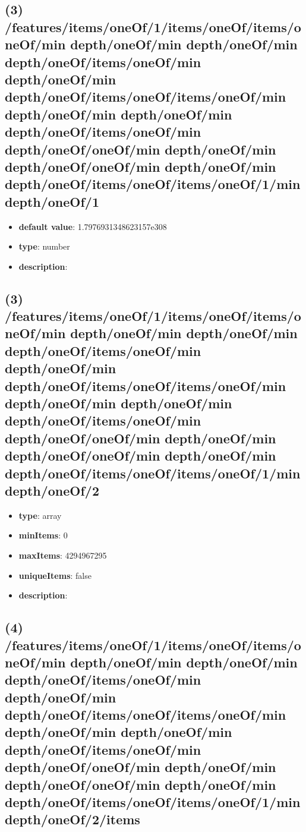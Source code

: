 \subsection{(3) /features/items/oneOf/1/items/oneOf/items/oneOf/min depth/oneOf/min depth/oneOf/min depth/oneOf/items/oneOf/min depth/oneOf/min depth/oneOf/items/oneOf/items/oneOf/min depth/oneOf/min depth/oneOf/min depth/oneOf/items/oneOf/min depth/oneOf/oneOf/min depth/oneOf/min depth/oneOf/oneOf/min depth/oneOf/min depth/oneOf/items/oneOf/items/oneOf/1/min depth/oneOf/1}
\begin{itemize}[leftmargin=3em]\item {\bf default value}: 1.7976931348623157e308
\item {\bf type}: number
\item {\bf description}: 
\end{itemize}\subsection{(3) /features/items/oneOf/1/items/oneOf/items/oneOf/min depth/oneOf/min depth/oneOf/min depth/oneOf/items/oneOf/min depth/oneOf/min depth/oneOf/items/oneOf/items/oneOf/min depth/oneOf/min depth/oneOf/min depth/oneOf/items/oneOf/min depth/oneOf/oneOf/min depth/oneOf/min depth/oneOf/oneOf/min depth/oneOf/min depth/oneOf/items/oneOf/items/oneOf/1/min depth/oneOf/2}
\begin{itemize}[leftmargin=3em]\item {\bf type}: array
\item {\bf minItems}: 0
\item {\bf maxItems}: 4294967295
\item {\bf uniqueItems}: false
\item {\bf description}: 
\end{itemize}\subsection{(4) /features/items/oneOf/1/items/oneOf/items/oneOf/min depth/oneOf/min depth/oneOf/min depth/oneOf/items/oneOf/min depth/oneOf/min depth/oneOf/items/oneOf/items/oneOf/min depth/oneOf/min depth/oneOf/min depth/oneOf/items/oneOf/min depth/oneOf/oneOf/min depth/oneOf/min depth/oneOf/oneOf/min depth/oneOf/min depth/oneOf/items/oneOf/items/oneOf/1/min depth/oneOf/2/items}

